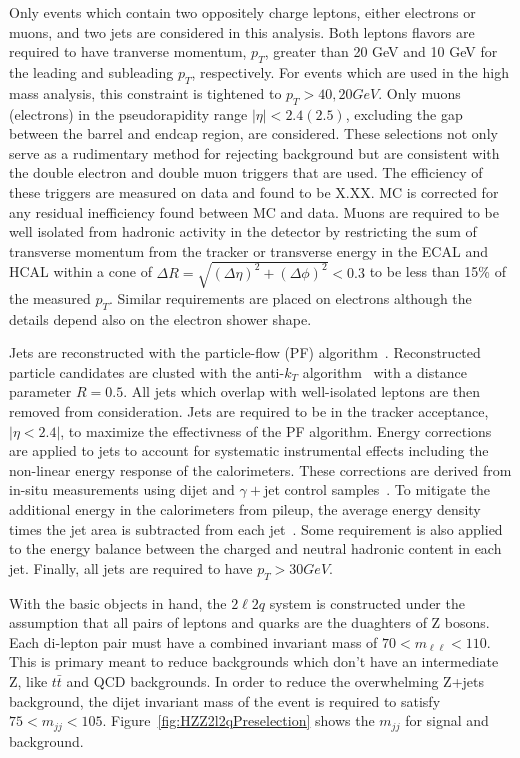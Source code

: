 Only events which contain two oppositely charge leptons, either electrons or
muons, and two jets are considered in this analysis.  Both leptons
flavors are required to have tranverse momentum, $p_T$, greater than 20 GeV
and 10 GeV for the leading and subleading $p_T$, respectively.  For events 
which are used in the high mass analysis, this constraint is tightened to 
$p_T>40, 20 GeV$.  Only muons (electrons) in the pseudorapidity range 
$|\eta|<2.4 (2.5)$, excluding the gap between the barrel and endcap region, 
are considered.  These selections not only serve as a rudimentary method for
rejecting background but are consistent with the double electron and 
double muon triggers that are used.  The efficiency of these triggers are 
measured on data and found to be X.XX.  MC is corrected for any residual 
inefficiency found between MC and data. Muons are required to be well 
isolated from hadronic activity in the detector by restricting the sum of
transverse momentum from the tracker or transverse energy in the ECAL and
HCAL within a cone of $\Delta R  = \sqrt{(\Delta\eta)^2+(\Delta\phi)^2}<0.3$
to be less than 15\% of the measured $p_T$.  Similar requirements are placed
on electrons although the details depend also on the electron shower shape.

Jets are reconstructed with the particle-flow (PF) algorithm~\cite{???}.
Reconstructed particle  candidates are clusted with the anti-$k_T$ 
algorithm~\cite{???} with a distance parameter $R=0.5$.  All jets which 
overlap with well-isolated leptons are then removed from consideration.  
Jets are required to be in the tracker acceptance, $|\eta<2.4|$, to maximize
the effectivness of the PF algorithm.  Energy corrections  are applied
to jets to account for systematic instrumental effects including the 
non-linear energy response of the calorimeters.  These corrections are 
derived from in-situ measurements using dijet and $\gamma+$jet control
samples~\cite{???}. To mitigate the additional energy in the calorimeters 
from pileup, the average energy density times the jet area is subtracted 
from each jet~\cite{???}.  Some requirement is also applied to the energy
balance between the charged and neutral hadronic content in each jet.  
Finally, all jets are required to have $p_T>30 GeV$.

With the basic objects in hand, the $2\ell2q$ system is constructed under
the assumption that all pairs of leptons and quarks are the duaghters of
Z bosons.  Each di-lepton pair must have a combined invariant mass of 
$70 < m_{\ell\ell} < 110$.  This is primary meant to reduce backgrounds which
don't have an intermediate Z, like $t\bar{t}$ and QCD backgrounds.  In order 
to reduce the overwhelming Z+jets background, the dijet invariant mass of 
the event is required to satisfy $75 < m_{jj} < 105$.  Figure~\ref{fig:HZZ2l2qPreselection} shows the $m_{jj}$ for signal and background.  

